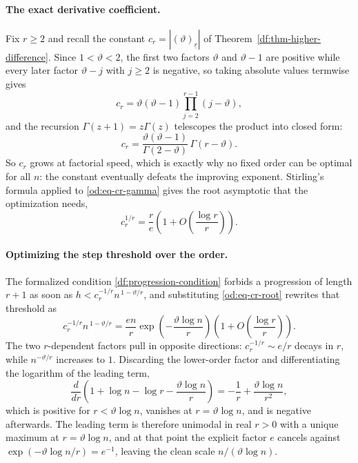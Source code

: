 \documentclass[11pt,oneside]{article}
\theoremstyle{definition}
\theoremstyle{remark}
\newcommand{\thetaq}{\vartheta}
\newcommand{\fall}[2]{\left(#1\right)_{\!\underline{#2}}}
\begin{document}
\paragraph{The exact derivative coefficient.}
Fix $r\ge2$ and recall the constant $c_r=|\fall{\thetaq}{r}|$ of
Theorem~\ref{df:thm-higher-difference}.  Since $1<\thetaq<2$, the first two factors
$\thetaq$ and $\thetaq-1$ are positive while every later factor $\thetaq-j$ with $j\ge2$ is
negative, so taking absolute values termwise gives
\[
 c_r=\thetaq(\thetaq-1)\prod_{j=2}^{r-1}(j-\thetaq),
\]
and the recursion $\Gamma(z+1)=z\Gamma(z)$ telescopes the product into closed form:
\begin{equation}
 c_r=\frac{\thetaq(\thetaq-1)}{\Gamma(2-\thetaq)}\,\Gamma(r-\thetaq).
 \label{od:eq-cr-gamma}
\end{equation}
So $c_r$ grows at factorial speed, which is exactly why no fixed order can be optimal for all
$n$: the constant eventually defeats the improving exponent.  Stirling's formula applied to
\eqref{od:eq-cr-gamma} gives the root asymptotic that the optimization needs,
\begin{equation}
 c_r^{1/r}=\frac re\left(1+O\!\left(\frac{\log r}{r}\right)\right).
 \label{od:eq-cr-root}
\end{equation}

\paragraph{Optimizing the step threshold over the order.}
The formalized condition \eqref{df:progression-condition} forbids a progression of length
$r+1$ as soon as $h<c_r^{-1/r}n^{\,1-\thetaq/r}$, and substituting \eqref{od:eq-cr-root}
rewrites that threshold as
\begin{equation}
 c_r^{-1/r}n^{\,1-\thetaq/r}
 =\frac{en}{r}\exp\!\left(-\frac{\thetaq\log n}{r}\right)
  \left(1+O\!\left(\frac{\log r}{r}\right)\right).
 \label{od:eq-threshold-approx}
\end{equation}
The two $r$-dependent factors pull in opposite directions: $c_r^{-1/r}\sim e/r$ decays in
$r$, while $n^{-\thetaq/r}$ increases to $1$.  Discarding the lower-order factor and
differentiating the logarithm of the leading term,
\[
 \frac{d}{dr}\left(1+\log n-\log r-\frac{\thetaq\log n}{r}\right)
 =-\frac1r+\frac{\thetaq\log n}{r^{2}},
\]
which is positive for $r<\thetaq\log n$, vanishes at $r=\thetaq\log n$, and is negative
afterwards.  The leading term is therefore unimodal in real $r>0$ with a unique maximum at
$r=\thetaq\log n$, and at that point the explicit factor $e$ cancels against
$\exp(-\thetaq\log n/r)=e^{-1}$, leaving the clean scale $n/(\thetaq\log n)$.
\end{document}
